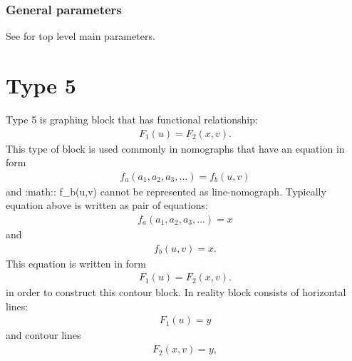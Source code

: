 \documentclass[a4paper,11pt,english]{sphinxmanual}
\begin{document}
\subsubsection{General parameters}
\label{\detokenize{types/types:id16}}
See {\hyperref[\detokenize{main_params:main-params}]{}} for top level main parameters.


\section{Type 5}
\label{\detokenize{types/types:type-5}}\label{\detokenize{types/types:type5-ref}}
Type 5 is graphing block that has functional relationship:
\begin{equation*}
\begin{split}F_1(u) = F_2(x,v).\end{split}
\end{equation*}
This type of block is used commonly in nomographs that have an equation in form
\begin{equation*}
\begin{split}f_a(a_1,a_2,a_3,...) = f_b(u,v)\end{split}
\end{equation*}
and :math:: f\_b(u,v) cannot be represented as line-nomograph.
Typically equation above is written as pair of equations:
\begin{equation*}
\begin{split}f_a(a_1,a_2,a_3,...) = x\end{split}
\end{equation*}
and
\begin{equation*}
\begin{split}f_b(u,v) = x.\end{split}
\end{equation*}
This equation is written in form
\begin{equation*}
\begin{split}F_1(u) = F_2(x,v).\end{split}
\end{equation*}
in order to construct this contour block. In reality block consists of horizontal lines:
\begin{equation*}
\begin{split}F_1(u) = y\end{split}
\end{equation*}
and contour lines
\begin{equation*}
\begin{split}F_2(x,v) = y,\end{split}
\end{equation*}
\end{document}
